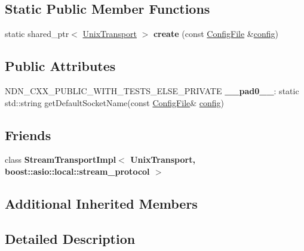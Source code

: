 \subsection*{Static Public Member Functions}
\begin{DoxyCompactItemize}
\item 
static shared\+\_\+ptr$<$ \hyperlink{classndn_1_1UnixTransport}{Unix\+Transport} $>$ {\bfseries create} (const \hyperlink{classndn_1_1ConfigFile}{Config\+File} \&\hyperlink{classconfig}{config})\hypertarget{classndn_1_1UnixTransport_a056169c5be5b3b6681f3b548747f0429}{}\label{classndn_1_1UnixTransport_a056169c5be5b3b6681f3b548747f0429}

\end{DoxyCompactItemize}
\subsection*{Public Attributes}
\begin{DoxyCompactItemize}
\item 
N\+D\+N\+\_\+\+C\+X\+X\+\_\+\+P\+U\+B\+L\+I\+C\+\_\+\+W\+I\+T\+H\+\_\+\+T\+E\+S\+T\+S\+\_\+\+E\+L\+S\+E\+\_\+\+P\+R\+I\+V\+A\+TE {\bfseries \+\_\+\+\_\+pad0\+\_\+\+\_\+}\+: static std\+::string get\+Default\+Socket\+Name(const \hyperlink{classndn_1_1ConfigFile}{Config\+File}\& \hyperlink{classconfig}{config})\hypertarget{classndn_1_1UnixTransport_a258ba4f215ae09e313ea55b73abd7c4d}{}\label{classndn_1_1UnixTransport_a258ba4f215ae09e313ea55b73abd7c4d}

\end{DoxyCompactItemize}
\subsection*{Friends}
\begin{DoxyCompactItemize}
\item 
class {\bfseries Stream\+Transport\+Impl$<$ Unix\+Transport, boost\+::asio\+::local\+::stream\+\_\+protocol $>$}\hypertarget{classndn_1_1UnixTransport_aa564325bbca4b761f4cbe2736bdf1280}{}\label{classndn_1_1UnixTransport_aa564325bbca4b761f4cbe2736bdf1280}

\end{DoxyCompactItemize}
\subsection*{Additional Inherited Members}


\subsection{Detailed Description}


